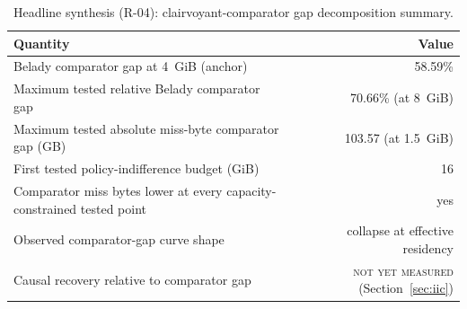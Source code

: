 \begin{table}[t]
\centering
\caption{Headline synthesis (R-04): clairvoyant-comparator gap decomposition summary.}
\label{tab:r2-04-synthesis}
\small
\begin{tabularx}{\linewidth}{@{}>{\raggedright\arraybackslash}X r@{}}
\toprule
Quantity & Value \\
\midrule
Belady comparator gap at 4~GiB (anchor) & 58.59\% \\
Maximum tested relative Belady comparator gap & 70.66\% (at 8~GiB) \\
Maximum tested absolute miss-byte comparator gap (GB) & 103.57 (at 1.5~GiB) \\
First tested policy-indifference budget (GiB) & 16 \\
Comparator miss bytes lower at every capacity-constrained tested point & yes \\
Observed comparator-gap curve shape & collapse at effective residency \\
Causal recovery relative to comparator gap & \textsc{not yet measured} (Section~\ref{sec:iic}) \\
\bottomrule
\end{tabularx}
\end{table}
